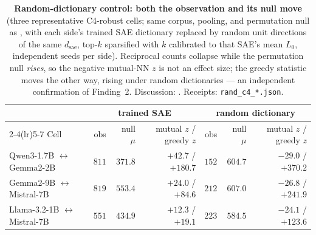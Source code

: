 \begin{table}[h]
\centering
\caption{\textbf{Random-dictionary control: both the observation and its null move}
(three representative C4-robust cells; same
corpus, pooling, and permutation null as , with each side's trained
SAE dictionary replaced by random unit directions of the same $d_{\text{sae}}$, top-$k$
sparsified with $k$ calibrated to that SAE's mean $L_0$, independent seeds per side).
Reciprocal counts collapse while the permutation null \emph{rises}, so the negative
mutual-NN $z$ is not an effect size; the greedy statistic moves the other way, rising under
random dictionaries --- an independent confirmation of Finding~2. Discussion:
. Receipts: \texttt{rand\_c4\_*.json}.}
\label{tab:rand_control}
\footnotesize
\setlength{\tabcolsep}{4pt}
\begin{tabular}{lrrrrrr}
\toprule
& \multicolumn{3}{c}{trained SAE} & \multicolumn{3}{c}{random dictionary} \\
\cmidrule(lr){2-4}\cmidrule(lr){5-7}
Cell & obs & null $\mu$ & mutual $z$ / greedy $z$ & obs & null $\mu$ & mutual $z$ / greedy $z$ \\
\midrule
Qwen3-1.7B $\leftrightarrow$ Gemma2-2B & $811$ & $371.8$ & $+42.7$ / $+180.7$ & $152$ & $604.7$ & $-29.0$ / $+370.2$ \\
Gemma2-9B $\leftrightarrow$ Mistral-7B & $819$ & $553.4$ & $+24.0$ / $+84.6$ & $212$ & $607.0$ & $-26.8$ / $+241.9$ \\
Llama-3.2-1B $\leftrightarrow$ Mistral-7B & $551$ & $434.9$ & $+12.3$ / $+19.1$ & $223$ & $584.5$ & $-24.1$ / $+123.6$ \\
\bottomrule
\end{tabular}
\end{table}

